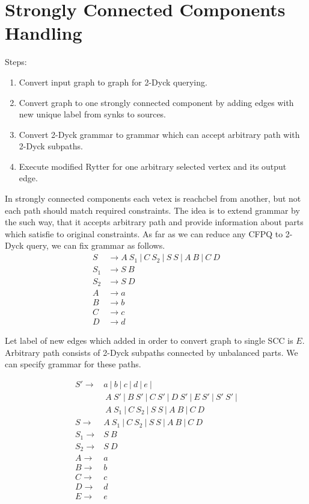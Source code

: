 \section{Strongly Connected Components Handling}

Steps:
\begin{enumerate}
\item Convert input graph to graph for 2-Dyck querying.
\item Convert graph to one strongly connected component by adding edges with new unique label from 
synks to sources.
\item Convert 2-Dyck grammar to grammar which can accept arbitrary path with 2-Dyck subpaths.
\item Execute modified Rytter for one arbitrary selected vertex and its output edge.
\end{enumerate}

In strongly connected components each vetex is reachcbel from another, but not each path should match 
required constraints.
The idea is to extend grammar by the such way, that it accepts arbitrary path and provide information 
about parts which satisfie to original constraints.
As far as we can reduce any CFPQ to 2-Dyck query, we can fix grammar as follows.
\begin{align*}
S & \rightarrow A \ S_1 \ | \ C \ S_2  \ | \ S \ S \ | \ A \ B \ | \ C \ D
\\
S_1 & \rightarrow S \ B 
\\
S_2 & \rightarrow S \ D 
\\
A & \rightarrow a 
\\
B & \rightarrow b 
\\
C & \rightarrow c 
\\
D & \rightarrow d
\end{align*}

Let label of new edges which added in order to convert graph to single SCC is $E$.
Arbitrary path consists of 2-Dyck subpaths connected by unbalanced parts.
We can specify grammar for these paths.

\begin{align*}
S'  \rightarrow & a \ | \ b \ | \ c \ | \ d \ |  \ e \ |
\\
  & \ A \ S' \ | \ B \ S' \ | \ C \ S' \ | \ D \ S' \ | \ E \ S' \ | \ S' \ S' \ |  
 \\
  & \ A \ S_1 \ | \ C \ S_2 \ | \ S \ S \ | \ A \ B \ | \ C \ D \   
\\
S   \rightarrow & A \ S_1 \ | \ C \ S_2  \ | \ S \ S \ | \ A \ B \ | \ C \ D
\\
S_1  \rightarrow & S \ B 
\\
S_2  \rightarrow & S \ D 
\\
A  \rightarrow & a 
\\
B  \rightarrow & b 
\\
C  \rightarrow & c 
\\
D  \rightarrow & d
\\
E  \rightarrow & e
\end{align*}

